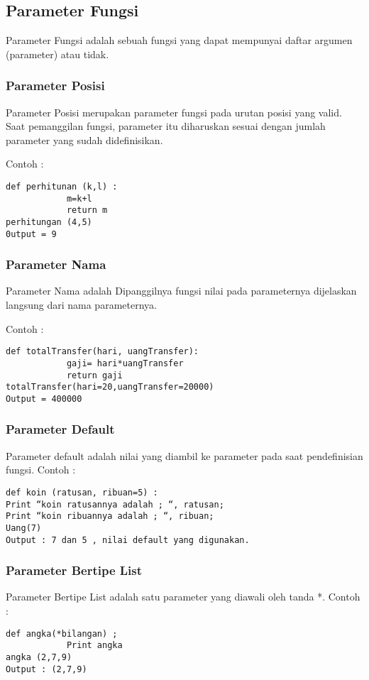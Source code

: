 \subsection{Parameter Fungsi} 
Parameter Fungsi adalah sebuah fungsi yang dapat mempunyai daftar argumen (parameter) atau tidak. 

\subsubsection{Parameter Posisi} 
Parameter Posisi merupakan parameter fungsi pada urutan posisi yang valid. Saat pemanggilan fungsi, parameter itu diharuskan sesuai dengan jumlah parameter yang sudah didefinisikan. 

Contoh : 
\begin{verbatim}
def perhitunan (k,l) :
            m=k+l
            return m
perhitungan (4,5)
0utput = 9
\end{verbatim}

\subsubsection{Parameter Nama} 
Parameter Nama adalah Dipanggilnya fungsi  nilai pada parameternya dijelaskan langsung dari nama parameternya. 

Contoh :
\begin{verbatim}
def totalTransfer(hari, uangTransfer):
            gaji= hari*uangTransfer
            return gaji
totalTransfer(hari=20,uangTransfer=20000)
Output = 400000
\end{verbatim}

\subsubsection{Parameter Default}
Parameter default adalah nilai yang diambil ke parameter pada saat pendefinisian fungsi.
Contoh :
\begin{verbatim}
def koin (ratusan, ribuan=5) :
Print “koin ratusannya adalah ; “, ratusan;
Print “koin ribuannya adalah ; “, ribuan;
Uang(7)
Output : 7 dan 5 , nilai default yang digunakan.
\end{verbatim}

\subsubsection{Parameter Bertipe List} 
Parameter Bertipe List adalah satu parameter yang diawali oleh tanda  *. 
Contoh :
\begin{verbatim}
def angka(*bilangan) ;
            Print angka
angka (2,7,9)
Output : (2,7,9)
\end{verbatim}

